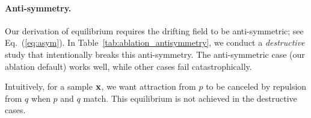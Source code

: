 \paragraph{Anti-symmetry.}
Our derivation of equilibrium requires the drifting field to be anti-symmetric; see Eq.~(\ref{eq:asym}). In Table~\ref{tab:ablation_antisymmetry}, we conduct a \textit{destructive} study that intentionally breaks this anti-symmetry.
The anti-symmetric case (our ablation default) works well, while other cases fail catastrophically.

Intuitively, for a sample $\mathbf{x}$, 
we want attraction from $p$ to be canceled by repulsion from $q$ when $p$ and $q$ match. This equilibrium is not achieved in the destructive cases.

\DeclareRobustCommand{\bgpos}[1]{%
  \begingroup
  \setlength{\fboxsep}{1pt}%
  \raisebox{0pt}[\height][0pt]{\colorbox{blue!15}{#1}}%
  \endgroup
}
\DeclareRobustCommand{\bgneg}[1]{%
  \begingroup
  \setlength{\fboxsep}{1pt}%
  \raisebox{0pt}[\height][0pt]{\colorbox{orange!15}{#1}}%
  \endgroup
}
